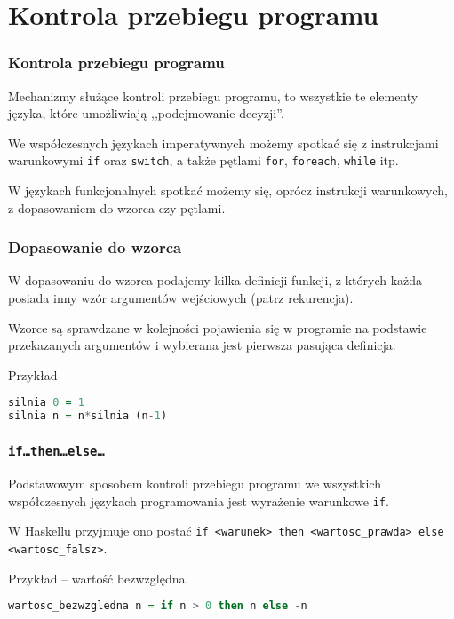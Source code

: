 \section{Kontrola przebiegu programu}
\sectionframe

\begin{frame}
  \frametitle{Kontrola przebiegu programu}
  Mechanizmy służące kontroli przebiegu programu, to wszystkie te elementy
  języka, które umożliwiają ,,podejmowanie decyzji''.
  \vspace{1em}\pause

  We współczesnych językach imperatywnych możemy spotkać się z instrukcjami
  warunkowymi \texttt{if} oraz \texttt{switch}, a także pętlami \texttt{for},
  \texttt{foreach}, \texttt{while} itp.
  \vspace{1em}\pause

  W językach funkcjonalnych spotkać możemy się, oprócz instrukcji warunkowych,
  z dopasowaniem do wzorca czy pętlami.
\end{frame}

\begin{frame}[fragile]
  \frametitle{Dopasowanie do wzorca}
  W dopasowaniu do wzorca podajemy kilka definicji funkcji, z których każda
  posiada inny wzór argumentów wejściowych (patrz rekurencja).
  \vspace{1em}\pause

  Wzorce są sprawdzane w kolejności pojawienia się w programie na podstawie
  przekazanych argumentów i wybierana jest pierwsza pasująca definicja.

  \begin{block}{Przykład}
    \begin{lstlisting}[language=Haskell]
silnia 0 = 1
silnia n = n*silnia (n-1)
    \end{lstlisting}
  \end{block}
\end{frame}

\begin{frame}[fragile]
  \frametitle{\texttt{if\ldots then\ldots else\ldots}}
  Podstawowym sposobem kontroli przebiegu programu we wszystkich współczesnych
  językach programowania jest wyrażenie warunkowe \texttt{if}.
  \vspace{1em}\pause
  
  W Haskellu przyjmuje ono postać \texttt{if <warunek> then <wartosc\_prawda> 
  else <wartosc\_falsz>}.
  \vspace{1em}
  \pause

  \begin{block}{Przykład -- wartość bezwzględna}
    \begin{lstlisting}[language=Haskell]
wartosc_bezwzgledna n = if n > 0 then n else -n
    \end{lstlisting}
  \end{block}
\end{frame}


